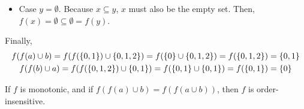 \documentclass{mwhittaker}
\begin{document}
\begin{itemize}
\begin{itemize}
      \item Case $y = \emptyset$.
        Because $x \subseteq y$, $x$ must also be the empty set. Then, $f(x) =
        \emptyset \subseteq \emptyset = f(y)$.
    \end{itemize}
    Finally,
    \begin{gather*}
      f(f(a) \cup b)
        = f(f(\{0, 1\}) \cup \{0, 1, 2\})
        = f(\{0\} \cup \{0, 1, 2\})
        = f(\{0, 1, 2\})
        = \{0, 1\} \\
        f(f(b) \cup a)
        = f(f(\{0, 1, 2\}) \cup \{0, 1\})
        = f(\{0, 1\} \cup \{0, 1\})
        = f(\{0, 1\})
        = \{0\}
    \end{gather*}
\end{itemize}

If $f$ is monotonic, and if $f(f(a) \cup b) = f(f(a \cup b))$, then $f$ is
order-insensitive.
\end{document}
